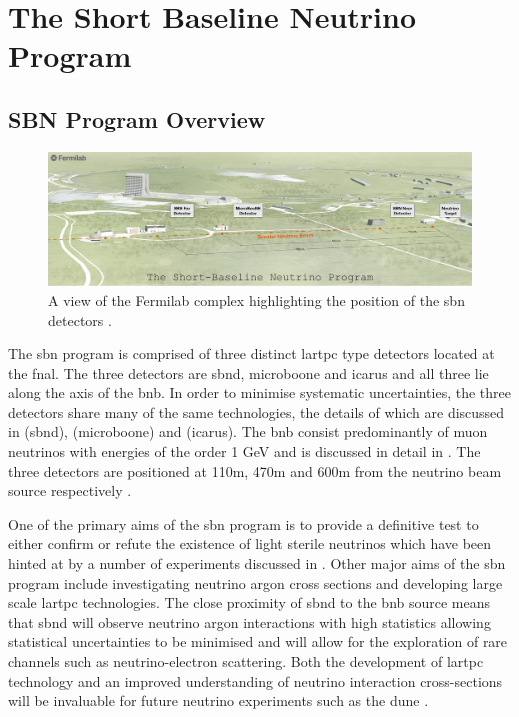 \chapter{The Short Baseline Neutrino Program}
\label{chap:SBN Program}

\section{SBN Program Overview}

\begin{figure}
    \centering
    \includegraphics[width = \largefigwidth]{figures-chap3/SBN_program.jpg}
    \caption[SBN map.]{A view of the Fermilab complex highlighting the position of the \gls{sbn} detectors \cite{SBN_paper}.}
    \label{fig:my_label}
\end{figure}

The \gls{sbn} program is comprised of three distinct \gls{lartpc} type detectors located at the \gls{fnal}. The three detectors are \gls{sbnd}, \gls{microboone} and \gls{icarus} and all three lie along the axis of the \gls{bnb}. In order to minimise systematic uncertainties, the three detectors share many of the same technologies, the details of which are discussed in  (\gls{sbnd}),  (\gls{microboone}) and  (\gls{icarus}). The \gls{bnb} consist predominantly of muon neutrinos with energies of the order 1 GeV and is discussed in detail in . The three detectors are positioned at 110m, 470m and 600m from the neutrino beam source respectively \cite{SBN_paper}. 

One of the primary aims of the \gls{sbn} program is to provide a definitive test to either confirm or refute the existence of light sterile neutrinos which have been hinted at by a number of experiments discussed in . Other major aims of the \gls{sbn} program include investigating neutrino argon cross sections and developing large scale \gls{lartpc} technologies. The close proximity of \gls{sbnd} to the \gls{bnb} source means that \gls{sbnd} will observe neutrino argon interactions with high statistics allowing statistical uncertainties to be minimised and will allow for the exploration of rare channels such as neutrino-electron scattering. Both the development of \gls{lartpc} technology and an improved understanding of neutrino interaction cross-sections will be invaluable for future neutrino experiments such as the \gls{dune} \cite{SBN_paper}.


